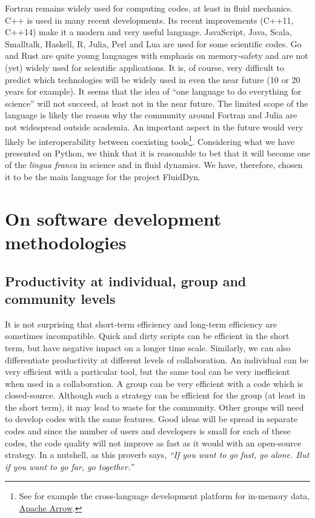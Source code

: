 Fortran remains widely used for computing codes, at least in fluid mechanics.
C++ is used in many recent developments. Its recent improvements (C++11, C++14)
make it a modern and very useful language.
%
JavaScript, Java, Scala, Smalltalk, Haskell, R, Julia, Perl and Lua are used for
some scientific codes. Go and Rust are quite young languages with emphasis on
memory-safety and are not (yet) widely used for scientific applications.
%
It is, of course, very difficult to predict which technologies will be widely
used in even the near future (10 or 20 years for example).
%
It seems that the idea of ``one language to do everything for science'' will
not succeed, at least not in the near future. 
%
The limited scope of the language is likely the reason why the community
around Fortran and Julia are not widespread outside academia.
%
An important aspect in the future would very likely be interoperability
between coexisting tools\footnote{See for example the cross-language development
platform for in-memory data, \href{https://arrow.apache.org/}{Apache Arrow}.}.
%
Considering what we have presented on Python, we think that it is reasonable to
bet that it will become one of the \textit{lingua franca} in science and in
fluid dynamics.
%
We have, therefore, chosen it to be the main language for the project FluidDyn.

\section{On software development methodologies}

\subsection{Productivity at individual, group and community levels}

It is not surprising
%
that short-term efficiency and long-term efficiency are sometimes incompatible.
%
Quick and dirty scripts can be efficient in the short term, but have negative
impact on a longer time scale.
%
Similarly, we can also differentiate productivity at different levels of
collaboration.
%
An individual can be very efficient with a particular tool, but the same tool
can be very inefficient when used in a collaboration.
%
A group can be very efficient with a code which is closed-source. Although such
a strategy can be efficient for the group (at least in the short term), it may
lead to waste for the community. Other groups will need to develop codes with
the same features.
%
Good ideas will be spread in separate codes and since the number of users and
developers is small for each of these codes, the code quality will not
improve as fast as it would with an open-source strategy. In a nutshell, as
this proverb says, \textit{``If you want to go fast, go alone. But if you want
to go far, go together.''}

